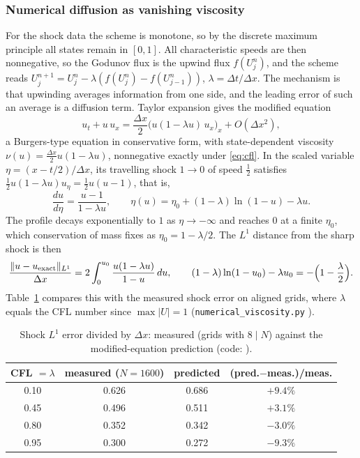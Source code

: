 \subsubsection{Numerical diffusion as vanishing viscosity}
\label{subsubsec:numerical-viscosity}

For the shock data the scheme is monotone, so by the discrete maximum principle
all states remain in $[0,1]$. All characteristic speeds are then nonnegative, so
the Godunov flux is the upwind flux $f(U_j^n)$, and the scheme reads
$U_j^{n+1}=U_j^n-\lambda(f(U_j^n)-f(U_{j-1}^n))$, $\lambda=\Delta t/\Delta x$.
The mechanism is that upwinding averages information from one side, and the leading
error of such an average is a diffusion term. Taylor expansion gives the modified equation
\begin{equation}
  \label{eq:modified-equation}
  u_t+u\,u_x=\frac{\Delta x}{2}\big(u(1-\lambda u)\,u_x\big)_x+O(\Delta x^2),
\end{equation}
a Burgers-type equation in conservative form, with state-dependent viscosity
$\nu(u)=\tfrac{\Delta x}2u(1-\lambda u)$, nonnegative exactly under
\eqref{eq:cfl}. In the scaled variable $\eta=(x-t/2)/\Delta x$, its travelling shock $1\to0$ of
speed $\tfrac12$ satisfies $\tfrac12u(1-\lambda u)u_\eta=\tfrac12u(u-1)$, that is,
\begin{equation}
  \frac{du}{d\eta}=\frac{u-1}{1-\lambda u},\qquad
  \eta(u)=\eta_0+(1-\lambda)\ln(1-u)-\lambda u .
\end{equation}
The profile decays exponentially to $1$ as $\eta\to-\infty$ and reaches $0$ at
a finite $\eta_0$, which conservation of mass fixes as $\eta_0=1-\lambda/2$. The
$L^1$ distance from the sharp shock is then
\begin{equation}
  \frac{\|u-u_{\rm exact}\|_{L^1}}{\Delta x}
  =2\int_0^{u_0}\frac{u(1-\lambda u)}{1-u}\,du,\qquad
  (1-\lambda)\ln(1-u_0)-\lambda u_0=-\Big(1-\frac\lambda2\Big).
\end{equation}
Table~\ref{tab:numerical-viscosity} compares this with the measured shock error on
aligned grids, where $\lambda$ equals the CFL number since $\max|U|=1$
(\texttt{numerical\_viscosity.py} \cite{code}).

\begin{table}[htbp]
\centering
\begin{tabular}{c c c c}
  CFL $=\lambda$ & measured ($N=1600$) & predicted & (pred.$-$meas.)/meas. \\\hline
  0.10 & 0.626 & 0.686 & $+9.4\%$ \\
  0.45 & 0.496 & 0.511 & $+3.1\%$ \\
  0.80 & 0.352 & 0.342 & $-3.0\%$ \\
  0.95 & 0.300 & 0.272 & $-9.3\%$
\end{tabular}
\caption{Shock $L^1$ error divided by $\Delta x$: measured (grids with $8\mid N$)
against the modified-equation prediction (code: \cite{code}).}
\label{tab:numerical-viscosity}
\end{table}

